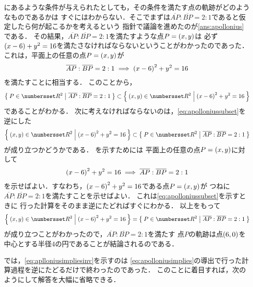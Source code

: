 \documentclass[11pt,a4paper]{ltjsarticle}
\newcommand*{\length}[1]{\overline{#1}}
\newcommand*{\coord}[1]{\paren{#1}}
\theoremstyle{definition}
\begin{document}
にあるような条件が与えられたとしても，その条件を満たす点の軌跡がどのようなものであるかは
すぐにはわからない．そこでまずは$\length{AP} : \length{BP} = 2 : 1$であると仮定したら何が起こるかを考えるという
指針で議論を進めたのが\cref{ans:apollonius}である．
その結果，$\length{AP} : \length{BP} = 2 : 1$を満たすような点$P = \coord{x,y}$は
必ず$\paren{x - 6} + y^2 = 16$を満たさなければならないということがわかったのであった．
これは，平面上の任意の点$P = \coord{x,y}$が
\begin{align}
	\length{AP} : \length{BP} = 2 : 1 \implies \paren{x - 6}^2 + y^2 = 16
	\label{eq:apolloniusimplies}
\end{align}
を満たすことに相当する．
このことから，
\begin{align}
	\setintension{P \in \Real ^2}{\length{AP} : \length{BP} = 2 : 1} \subset
	\setintension{\coord{x,y} \in \Real^2}{\paren{x - 6}^2 + y^2 = 16}
	\label{eq:apolloniussubset}
\end{align}
であることがわかる．
次に考えなければならないのは，\cref{eq:apolloniussubset}を逆にした
\begin{align}
	\setintension{\coord{x,y} \in \Real^2}{\paren{x - 6}^2 + y^2 = 16} \subset
	\setintension{P \in \Real ^2}{\length{AP} : \length{BP} = 2 : 1}
	\label{eq:apolloniussubsetinv}
\end{align}
が成り立つかどうかである．
を示すためには
平面上の任意の点$P = \coord{x,y}$に対して
\begin{align}
	\paren{x - 6}^2 + y^2 = 16 \implies \length{AP} : \length{BP} = 2 : 1
	\label{eq:aplloniusimpliesinv}
\end{align}
を示せばよい．すなわち，$\paren{x - 6}^2 + y^2 = 16$である点$P = \coord{x, y}$が
つねに$\length{AP} : \length{BP} = 2 : 1$を満たすことを示せばよい．
これは\cref{eq:apolloniussubset}を示すときに
行った計算をそのまま逆にたどればすぐにわかる．
以上をもって
\begin{align}
	\setintension{\coord{x,y} \in \Real^2}{\paren{x - 6}^2 + y^2 = 16} =
	\setintension{P \in \Real ^2}{\length{AP} : \length{BP} = 2 : 1}
	\label{eq:apolloniusequal}
\end{align}
が成り立つことがわかったので，$\length{AP} : \length{BP} = 2 : 1$を満たす
点$P$の軌跡は点$\coord{6, 0}$を中心とする半径$4$の円であることが結論されるのである．


では，\cref{eq:aplloniusimpliesinv}を示すのは
\cref{eq:apolloniusimplies}の導出で行った計算過程を逆にたどるだけで終わったのであった．
このことに着目すれば，次のようにして解答を大幅に省略できる．
\end{document}
